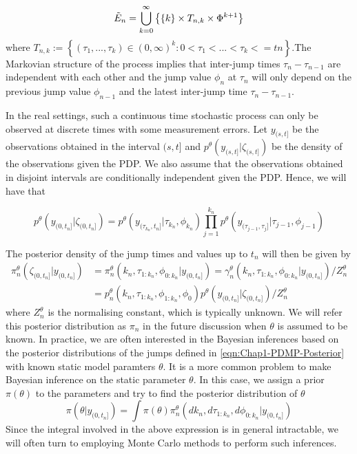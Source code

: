 \documentclass[12pt,a4paper]{article}
\begin{document}
\begin{equation*}
    \Tilde{E}_n = \bigcup_{k=0}^{\infty} \left\{\{k\}\times T_{n,k} \times \Phi^{k+1}\right\}
\end{equation*}
where $T_{n,k} := \left\{(\tau_1,...,\tau_k) \in (0,\infty)^k : 0 < \tau_1 <...< \tau_k <= tn\right\}$.The Markovian structure of the process implies that inter-jump times $\tau_n - \tau_{n-1}$ are independent with each other and the jump value $\phi_n$ at $\tau_n$ will only depend on the previous jump value $\phi_{n-1}$ and the latest inter-jump time $\tau_n - \tau_{n-1}$.

In the real settings, such a continuous time stochastic process can only be observed at discrete times with some measurement errors. Let $y_{(s,t]}$ be the observations obtained in the interval $(s,t]$ and $p^{\theta}(y_{(s,t]}|\zeta_{(s,t]})$ be the density of the observations given the PDP. We also assume that the observations obtained in disjoint intervals are conditionally independent given the PDP. Hence, we will have that 

\begin{equation}
\label{eqn:Chap1-PDMP-Likelihood}
    p^{\theta}(y_{(0,t_n]}|\zeta_{(0,t_n]}) = p^{\theta}(y_{(\tau_{k_n},t_n]}|\tau_{k_n},\phi_{k_n}) \prod_{j=1}^{k_n} p^{\theta}(y_{(\tau_{j-1},\tau_j]}|\tau_{j-1},\phi_{j-1})
\end{equation}


The posterior density of the jump times and values up to $t_n$ will then be given by 
\begin{equation}
\label{eqn:Chap1-PDMP-Posterior}
	\begin{split}
		 \pi_n^{\theta}(\zeta_{(0,t_n]}|y_{(0,t_n]}) &= \pi_n^{\theta}(k_n,\tau_{1:k_n},\phi_{0:k_n}|y_{(0,t_n]}) = \gamma_{n}^{\theta}(k_n,\tau_{1:k_n},\phi_{0:k_n}|y_{(0,t_n]})/Z_n^{\theta}\\
		 &=p_n^{\theta}(k_n,\tau_{1:k_n},\phi_{1:k_n},\phi_0)  p^{\theta}(y_{(0,t_n]}|\zeta_{(0,t_n]}) / Z_n^{\theta}		
	\end{split} 
\end{equation}
where $Z_n^{\theta}$ is the normalising constant, which is typically unknown. We will refer this posterior distribution as $\pi_n$ in the future discussion when \(\theta\) is assumed to be known. In practice, we are often interested in the Bayesian inferences based on the posterior distributions of the jumps defined in \eqref{eqn:Chap1-PDMP-Posterior} with known static model paramters \(\theta\). It is a more common problem to make Bayesian inference on the static parameter \(\theta\). In this case, we assign a prior \(\pi(\theta)\) to the parameters and try to find the posterior distribution of \(\theta\)
\[
  \pi(\theta|y_{(0,t_n]}) = \int \pi(\theta)\pi_n^{\theta}(dk_n,d\tau_{1:k_n},d\phi_{0:k_n}|y_{(0,t_n]})  
\]
Since the integral involved in the above expression is in general intractable, we will often turn to employing Monte Carlo methods to perform such inferences. 
\end{document}
